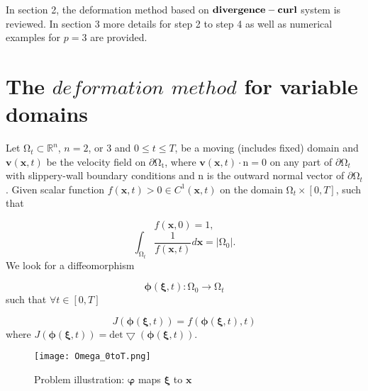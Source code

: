 \documentclass{article}
\theoremstyle{definition}
\theoremstyle{remark}
\numberwithin{equation}{section}
\numberwithin{subsection}{section}
\begin{document}
In section 2, the deformation method based on $\bf{divergence-curl}$ system is reviewed. In section 3 more details for step 2 to step 4 as well as numerical examples for $p=3$ are provided. 

\section{The $deformation$ $method$ for variable domains}
Let $\mathrm{\Omega}_t \subset \mathbb R^n$, $n=2$, or $3$ and $0\leq{t}\leq{T}$, be a moving (includes fixed) domain and $\pmb{v}(\pmb{x},t)$ be the velocity field on $\partial\mathrm{\Omega_t}$, where $\pmb{v}(\pmb{x},t)\cdot{\pmb{\mathrm{n}}}=0$ on any part of $\partial\mathrm{\Omega}_t$ with slippery-wall boundary conditions and $\pmb{\mathrm{n}}$ is the outward normal vector of $\partial\mathrm{\Omega}_t$. Given scalar function $f(\pmb{x},t)>0 \in C^1(\pmb{x},t)$ on the domain $\mathrm{\Omega}_t \times [0,T]$, such that

	\begin{equation}\label{eq:plm1}
	f(\pmb{x},0)=1,
	\end{equation}
	\begin{equation}
	\int_{\mathrm{\Omega}_t} \dfrac{1}{f(\pmb{x},t)}d\pmb{x} = |\mathrm{\Omega}_0|.
	\end{equation}
We look for a diffeomorphism 

	\begin{equation} 
	\pmb{\phi}(\pmb{\xi},t):\mathrm{\Omega}_0\rightarrow\mathrm{\Omega}_t
	\end{equation}
such that $\forall t \in [0,T]$

	\begin{equation}\label{eq:plm2}
	J(\pmb{\phi}(\pmb{\xi},t)) = f(\pmb{\phi}(\pmb{\xi},t),t)
	\end{equation}
where $J(\pmb{\phi}(\pmb{\xi},t)) =\text{det}\bigtriangledown(\pmb{\phi}(\pmb{\xi},t)).$ 
\begin{figure}[H]
		\begin{center}
		{\texttt{[image: Omega\_0toT.png]}}
		\end{center}
		\caption{Problem illustration: $\pmb{\varphi}$ maps $\pmb{\xi}$ to $\pmb{x}$}
\end{figure}
	
\end{document}
